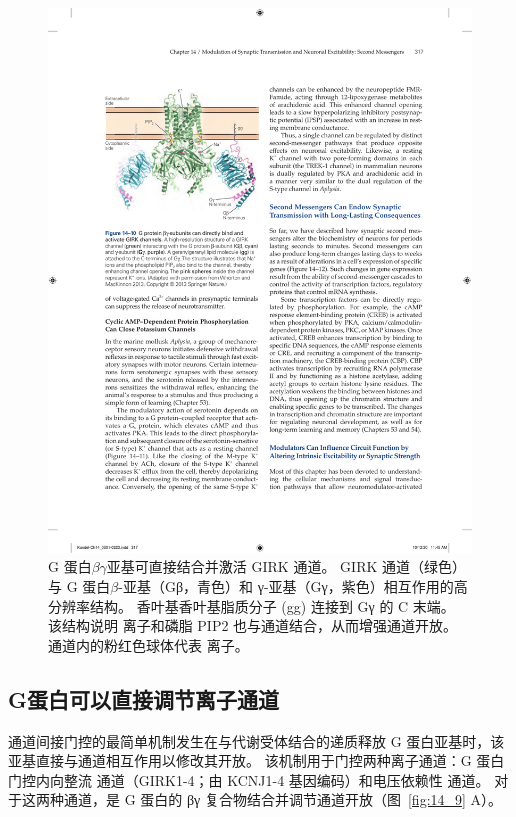 \begin{figure}[htbp]
	\centering
	\includegraphics[width=0.5\linewidth]{chap14/fig_14_10}
	\caption{G 蛋白$\beta\gamma$亚基可直接结合并激活 GIRK 通道。
		GIRK 通道（绿色）与 G 蛋白$\beta$-亚基（Gβ，青色）和 γ-亚基（Gγ，紫色）相互作用的高分辨率结构。
		香叶基香叶基脂质分子 (gg) 连接到 Gγ 的 C 末端。
		该结构说明  离子和磷脂 PIP2 也与通道结合，从而增强通道开放。
		通道内的粉红色球体代表  离子\cite{whorton2013x}。}
	\label{fig:14_10}
\end{figure}



\subsection{G蛋白可以直接调节离子通道}

通道间接门控的最简单机制发生在与代谢受体结合的递质释放 G 蛋白亚基时，该亚基直接与通道相互作用以修改其开放。
该机制用于门控两种离子通道：G 蛋白门控内向整流  通道（GIRK1-4；由 KCNJ1-4 基因编码）和电压依赖性  通道。
对于这两种通道，是 G 蛋白的 βγ 复合物结合并调节通道开放（图~\ref{fig:14_9} A）。


